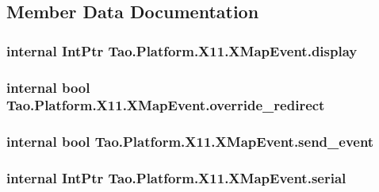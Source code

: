 \subsection{Member Data Documentation}
\hypertarget{struct_tao_1_1_platform_1_1_x11_1_1_x_map_event_acfab687760d00731046e7c1d13f4e02d}{
\subsubsection[{display}]{\setlength{\rightskip}{0pt plus 5cm}internal IntPtr {\bf Tao.Platform.X11.XMapEvent.display}}}
\label{struct_tao_1_1_platform_1_1_x11_1_1_x_map_event_acfab687760d00731046e7c1d13f4e02d}
\hypertarget{struct_tao_1_1_platform_1_1_x11_1_1_x_map_event_a6cd63e678f3517dd93a5746c58ff584a}{
\subsubsection[{override\_\-redirect}]{\setlength{\rightskip}{0pt plus 5cm}internal bool {\bf Tao.Platform.X11.XMapEvent.override\_\-redirect}}}
\label{struct_tao_1_1_platform_1_1_x11_1_1_x_map_event_a6cd63e678f3517dd93a5746c58ff584a}
\hypertarget{struct_tao_1_1_platform_1_1_x11_1_1_x_map_event_ac3f6bac63a355a871d8e385b8de94ae1}{
\subsubsection[{send\_\-event}]{\setlength{\rightskip}{0pt plus 5cm}internal bool {\bf Tao.Platform.X11.XMapEvent.send\_\-event}}}
\label{struct_tao_1_1_platform_1_1_x11_1_1_x_map_event_ac3f6bac63a355a871d8e385b8de94ae1}
\hypertarget{struct_tao_1_1_platform_1_1_x11_1_1_x_map_event_a1dc325d8590c607e012370c955bbfc05}{
\subsubsection[{serial}]{\setlength{\rightskip}{0pt plus 5cm}internal IntPtr {\bf Tao.Platform.X11.XMapEvent.serial}}}
